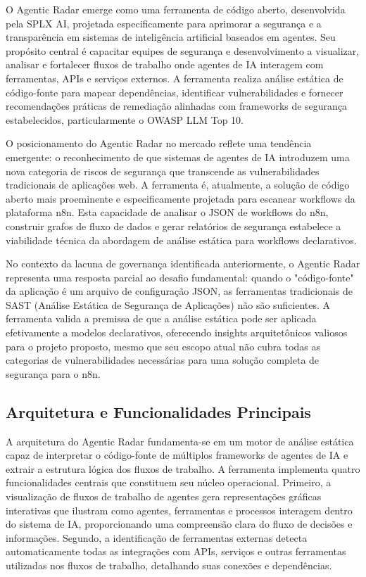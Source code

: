 \documentclass{sftex}
\begin{document}
O Agentic Radar emerge como uma ferramenta de código aberto, desenvolvida pela SPLX AI, projetada especificamente para aprimorar a segurança e a transparência em sistemas de inteligência artificial baseados em agentes. Seu propósito central é capacitar equipes de segurança e desenvolvimento a visualizar, analisar e fortalecer fluxos de trabalho onde agentes de IA interagem com ferramentas, APIs e serviços externos. A ferramenta realiza análise estática de código-fonte para mapear dependências, identificar vulnerabilidades e fornecer recomendações práticas de remediação alinhadas com frameworks de segurança estabelecidos, particularmente o OWASP LLM Top 10.

O posicionamento do Agentic Radar no mercado reflete uma tendência emergente: o reconhecimento de que sistemas de agentes de IA introduzem uma nova categoria de riscos de segurança que transcende as vulnerabilidades tradicionais de aplicações web. A ferramenta é, atualmente, a solução de código aberto mais proeminente e especificamente projetada para escanear workflows da plataforma n8n. Esta capacidade de analisar o JSON de workflows do n8n, construir grafos de fluxo de dados e gerar relatórios de segurança estabelece a viabilidade técnica da abordagem de análise estática para workflows declarativos.

No contexto da lacuna de governança identificada anteriormente, o Agentic Radar representa uma resposta parcial ao desafio fundamental: quando o "código-fonte" da aplicação é um arquivo de configuração JSON, as ferramentas tradicionais de SAST (Análise Estática de Segurança de Aplicações) não são suficientes. A ferramenta valida a premissa de que a análise estática pode ser aplicada efetivamente a modelos declarativos, oferecendo insights arquitetônicos valiosos para o projeto proposto, mesmo que seu escopo atual não cubra todas as categorias de vulnerabilidades necessárias para uma solução completa de segurança para o n8n.

\subsection{Arquitetura e Funcionalidades Principais}

A arquitetura do Agentic Radar fundamenta-se em um motor de análise estática capaz de interpretar o código-fonte de múltiplos frameworks de agentes de IA e extrair a estrutura lógica dos fluxos de trabalho. A ferramenta implementa quatro funcionalidades centrais que constituem seu núcleo operacional. Primeiro, a visualização de fluxos de trabalho de agentes gera representações gráficas interativas que ilustram como agentes, ferramentas e processos interagem dentro do sistema de IA, proporcionando uma compreensão clara do fluxo de decisões e informações. Segundo, a identificação de ferramentas externas detecta automaticamente todas as integrações com APIs, serviços e outras ferramentas utilizadas nos fluxos de trabalho, detalhando suas conexões e dependências.
\end{document}
